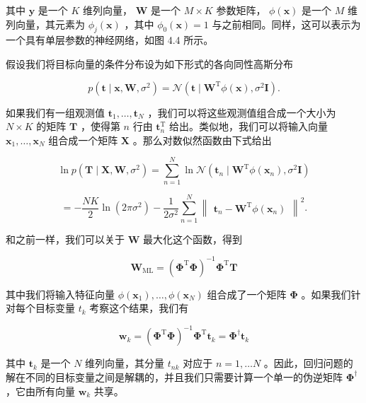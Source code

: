 \documentclass[10pt]{article}
\begin{document}
其中 \(\mathbf{y}\) 是一个 \(K\) 维列向量， \(\mathbf{W}\) 是一个 \(M \times  K\) 参数矩阵， \(\phi \left( \mathbf{x}\right)\) 是一个 \(M\) 维列向量，其元素为 \({\phi }_{j}\left( \mathbf{x}\right)\) ，其中 \({\phi }_{0}\left( \mathbf{x}\right)  = 1\) 与之前相同。同样，这可以表示为一个具有单层参数的神经网络，如图 4.4 所示。

假设我们将目标向量的条件分布设为如下形式的各向同性高斯分布

\[
p\left( {\mathbf{t} \mid  \mathbf{x},\mathbf{W},{\sigma }^{2}}\right)  = \mathcal{N}\left( {\mathbf{t} \mid  {\mathbf{W}}^{\mathrm{T}}\phi \left( \mathbf{x}\right) ,{\sigma }^{2}\mathbf{I}}\right) . \tag{4.29}
\]

如果我们有一组观测值 \({\mathbf{t}}_{1},\ldots ,{\mathbf{t}}_{N}\) ，我们可以将这些观测值组合成一个大小为 \(N \times  K\) 的矩阵 \(\mathbf{T}\) ，使得第 \(n\) 行由 \({\mathbf{t}}_{n}^{\mathrm{T}}\) 给出。类似地，我们可以将输入向量 \({\mathbf{x}}_{1},\ldots ,{\mathbf{x}}_{N}\) 组合成一个矩阵 \(\mathbf{X}\) 。那么对数似然函数由下式给出

\[
\ln p\left( {\mathbf{T} \mid  \mathbf{X},\mathbf{W},{\sigma }^{2}}\right)  = \mathop{\sum }\limits_{{n = 1}}^{N}\ln \mathcal{N}\left( {{\mathbf{t}}_{n} \mid  {\mathbf{W}}^{\mathrm{T}}\phi \left( {\mathbf{x}}_{n}\right) ,{\sigma }^{2}\mathbf{I}}\right)
\]

\[
=  - \frac{NK}{2}\ln \left( {{2\pi }{\sigma }^{2}}\right)  - \frac{1}{2{\sigma }^{2}}\mathop{\sum }\limits_{{n = 1}}^{N}{\begin{Vmatrix}{\mathbf{t}}_{n} - {\mathbf{W}}^{\mathrm{T}}\phi \left( {\mathbf{x}}_{n}\right) \end{Vmatrix}}^{2}. \tag{4.30}
\]

和之前一样，我们可以关于 \(\mathbf{W}\) 最大化这个函数，得到

\[
{\mathbf{W}}_{\mathrm{{ML}}} = {\left( {\mathbf{\Phi }}^{\mathrm{T}}\mathbf{\Phi }\right) }^{-1}{\mathbf{\Phi }}^{\mathrm{T}}\mathbf{T} \tag{4.31}
\]

其中我们将输入特征向量 \(\phi \left( {\mathbf{x}}_{1}\right) ,\ldots ,\phi \left( {\mathbf{x}}_{N}\right)\) 组合成了一个矩阵 \(\mathbf{\Phi }\) 。如果我们针对每个目标变量 \({t}_{k}\) 考察这个结果，我们有

\[
{\mathbf{w}}_{k} = {\left( {\mathbf{\Phi }}^{\mathrm{T}}\mathbf{\Phi }\right) }^{-1}{\mathbf{\Phi }}^{\mathrm{T}}{\mathbf{t}}_{k} = {\mathbf{\Phi }}^{ \dagger  }{\mathbf{t}}_{k} \tag{4.32}
\]

其中 \({\mathbf{t}}_{k}\) 是一个 \(N\) 维列向量，其分量 \({t}_{nk}\) 对应于 \(n = 1,\ldots N\) 。因此，回归问题的解在不同的目标变量之间是解耦的，并且我们只需要计算一个单一的伪逆矩阵 \({\mathbf{\Phi }}^{ \dagger  }\) ，它由所有向量 \({\mathbf{w}}_{k}\) 共享。
\end{document}
